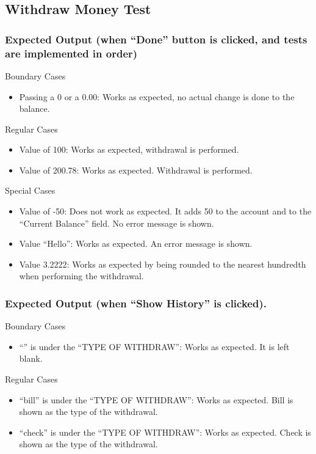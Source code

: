 \documentclass[12pt]{article}
\begin{document}
\subsection{Withdraw Money Test}

\subsubsection{Expected Output (when “Done” button is clicked, and tests are implemented in order)}

Boundary Cases
\begin{itemize}
  \item Passing a 0 or a 0.00: Works as expected, no actual change is done to the balance.
\end{itemize}

Regular Cases
\begin{itemize}
  \item Value of 100: Works as expected, withdrawal is performed.
  \item Value of 200.78: Works as expected. Withdrawal is performed.
\end{itemize}

Special Cases
\begin{itemize}
  \item Value of -50: Does not work as expected.  It adds 50 to the account and to the “Current Balance” field. No error message is shown.
  \item Value “Hello”: Works as expected. An error message is shown.
  \item Value 3.2222: Works as expected by being rounded to the nearest hundredth when performing the withdrawal. 
\end{itemize}

\subsubsection{Expected Output (when “Show History” is clicked).}

Boundary Cases
\begin{itemize}
  \item “” is under the “TYPE OF WITHDRAW”: Works as expected. It is left blank.
\end{itemize}

Regular Cases
\begin{itemize}
  \item “bill” is under the “TYPE OF WITHDRAW”: Works as expected. Bill is shown as the type of the withdrawal.
  \item “check” is under the “TYPE OF WITHDRAW”: Works as expected. Check is shown as the type of the withdrawal.
\end{itemize}
\end{document}
